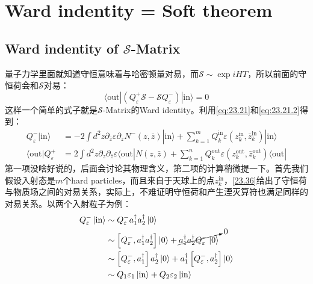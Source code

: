\section{Ward indentity = Soft theorem}
\subsection{Ward indentity of $\mathcal{S}$\mbox{-}Matrix}
量子力学里面就知道守恒意味着与哈密顿量对易，而$\mathcal{S}\sim \exp{iHT}$，所以前面的守恒荷会和$\mathcal{S}$对易：
\begin{equation}\label{eq:24.1}
	\boxed{\langle\mathrm{out}|\left(Q_\varepsilon^+\mathcal{S}-\mathcal{S}Q_\varepsilon^-\right)|\mathrm{in}\rangle=0}
\end{equation}
这样一个简单的式子就是$\mathcal{S}$\mbox{-}Matrix的Ward identity。利用\ref{eq:23.21}和\ref{eq:23.21.2}得到：
\begin{equation}
	\begin{aligned}
		Q_\varepsilon^-|\mathrm{in}\rangle&=-2\int d^2z\partial_{\bar{z}}\varepsilon\partial_zN^-(z,\bar{z})|\mathrm{in}\rangle+\sum_{k=1}^mQ_k^\mathrm{in}\varepsilon(z_k^\mathrm{in},\bar{z}_k^\mathrm{in})|\mathrm{in}\rangle \\
		\langle\mathrm{out}|Q_\varepsilon^+&=2\int d^2z\partial_z\partial_{\bar{z}}\varepsilon\langle\mathrm{out}|N(z,\bar{z})+\sum_{k=1}^nQ_k^\mathrm{out}\varepsilon(z_k^\mathrm{out},\bar{z}_k^\mathrm{out})\langle\mathrm{out}|
	\end{aligned}
\end{equation}
第一项没啥好说的，后面会讨论其物理含义，第二项的计算稍微提一下。首先我们假设入射态是$m$个hard particles，而且来自于天球上的点$z_k^{\mathrm{in}}$，\ref{23.36}给出了守恒荷与物质场之间的对易关系，实际上，不难证明守恒荷和产生湮灭算符也满足同样的对易关系。以两个入射粒子为例：
\begin{equation}
	\begin{aligned}
		Q^-_{\varepsilon}\ket{\text{in}}&\sim Q^-_{\varepsilon}a_1^\dagger a_2^\dagger\ket{0}\\
		&\sim \left[Q^-_{\varepsilon},a_1^\dagger a_2^\dagger\right]\ket{0}+\cancelto{0}{a_1^\dagger a_2^\dagger Q^-_{\varepsilon}\ket{0}}\\
		&\sim  \left[Q^-_{\varepsilon},a_1^\dagger \right]a_2^\dagger\ket{0}+a_1^\dagger\left[Q^-_{\varepsilon},a_2^\dagger \right]\ket{0}\\
		&\sim Q_1\varepsilon_1\ket{\text{in}}+Q_2\varepsilon_2\ket{\text{in}}
	\end{aligned}
\end{equation}
